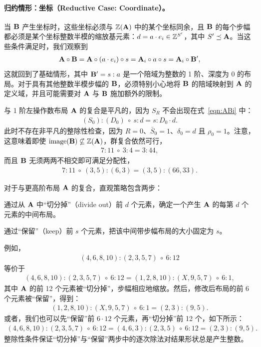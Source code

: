 \paragraph{归约情形：坐标（Reductive Case: Coordinate）。}

当 $\mathbf{B}$ 产生坐标时，这些坐标必须与 $\mathbb{Z}(\mathbf{A})$ 中的某个坐标同余，且 $\mathbf{B}$ 的每个步幅都必须是某个坐标整数半模的缩放基元素：$d = a \cdot e_i \in \mathbb{Z}^{S'}$，其中 $S' \preceq \mathbf{A}$。当这些条件满足时，我们观察到
\begin{align*}
\mathbf{A} \circ \mathbf{B} = \mathbf{A} \circ (a \cdot e_i) \circ s = \mathbf{A}_i \circ a \circ s = \mathbf{A}_i \circ \mathbf{B}',
\end{align*}
这就回到了基础情形，其中 $\mathbf{B}' = s : a$ 是一个陪域为整数的 1 阶、深度为 0 的布局。对于具有其他整数半模步幅的 $\mathbf{B}$，必须特别小心地将 $\mathbf{B}$ 的陪域映射到 $\mathbf{A}$ 的定义域，并且可能需要对 $\mathbf{A}$ 与 $\mathbf{B}$ 施加额外的限制。


与 1 阶左操作数布局 $\mathbf{A}$ 的复合是平凡的，因为 $S_R$ 不会出现在式~\eqref{eqn:ABi} 中：
\begin{align*}
(S_0):(D_0) \ \circ \  s:d = s:D_0 \cdot d.
\end{align*}
此时不存在非平凡的整除性检查，因为 $R = 0$、$\bar{S}_0 = 1$、$\delta_0 = d$ 且 $\rho_0 = 1$。注意，这意味着即使 $\text{image}(\mathbf{B}) \not\subseteq \mathbb{Z}(\mathbf{A})$，群复合依然可行，
\begin{align*}
7:11 \ \circ \ 3:4 = 3:44,
\end{align*}
而且 $\mathbf{B}$ 无须两两不相交即可满足分配性，
\begin{align*}
7:11 \ \circ \ (3,5):(6,3) = (3,5):(66,33).
\end{align*}

对于与更高阶布局 $\mathbf{A}$ 的复合，直观策略包含两步：
\begin{compactitem}
\item 通过从 $\mathbf{A}$ 中“切分掉”（divide out）前 $d$ 个元素，确定一个产生 $\mathbf{A}$ 的每第 $d$ 个元素的中间布局。
\item 通过“保留”（keep）前 $s$ 个元素，把该中间带步幅布局的大小固定为 $s$。
\end{compactitem}
例如，
\begin{align*}
(4,6,8,10):(2,3,5,7) \ \circ \  6:12
\end{align*}
等价于
\begin{align*}
(4,6,8,10):(2,3,5,7) \ \circ \  6:12 = (1,2,8,10):(X,9,5,7) \ \circ \  6:1,
\end{align*}
其中 $\mathbf{A}$ 的前 12 个元素被“切分掉”，步幅相应地缩放。然后，修改后布局的前 6 个元素被“保留”，得到：
\begin{align*}
(1,2,8,10):(X,9,5,7) \ \circ \  6:1 = (2,3):(9,5).
\end{align*}
或者，我们也可以先“保留”前 $6 \cdot 12$ 个元素，再“切分掉”前 12 个，如下所示：
\begin{align*}
(4,6,8,10):(2,3,5,7) \ \circ \  6:12 = (4,6,3):(2,3,5) \ \circ \  6:12 = (2,3):(9,5).
\end{align*}
整除性条件保证“切分掉”与“保留”两步中的逐次除法对结果形状总是产生整数。

